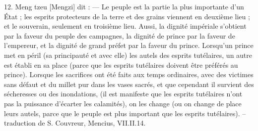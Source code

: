\begin{singlequote}
\end{singlequote}

\begin{singlequote}
    12.	Meng tzeu [Mengzi] dit :
—	Le peuple est la partie la plus importante d’un État ; les esprits protecteurs de la terre et des grains viennent en deuxième lieu ; et le souverain, seulement en troisième lieu. Aussi, la dignité impériale s’obtient par la faveur du peuple des campagnes, la dignité de prince par la faveur de l’empereur, et la dignité de grand préfet par la faveur du prince. Lorsqu’un prince met en péril (sa principauté et avec elle) les autels des esprits tutélaires, un autre est établi en sa place (parce que les esprits tutélaires doivent être préférés au prince). Lorsque les sacrifices ont été faits aux temps ordinaires, avec des victimes sans défaut et du millet pur dans les vases sacrés, et que cependant il survient des sécheresses ou des inondations, (il est manifeste que les esprits tutélaires n’ont pas la puissance d’écarter les calamités), on les change (ou on change de place leurs autels, parce que le peuple est plus important que les esprits tutélaires).
-- traduction de S. Couvreur, Mencius, VII.II.14.

\end{singlequote}
